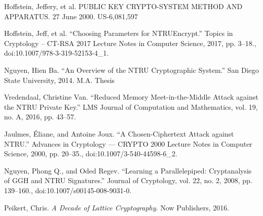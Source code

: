 \documentclass[12pt]{amsart}
\theoremstyle{definition}
\theoremstyle{remark}
\begin{document}
\begin{thebibliography}{1}

 Hoffstein, Jeffery, et al. PUBLIC KEY CRYPTO-SYSTEM METHOD AND APPARATUS. 27 June 2000. US-6,081,597

 Hoffstein, Jeff, et al. “Choosing Parameters for NTRUEncrypt.” Topics in Cryptology – CT-RSA 2017 Lecture Notes in Computer Science, 2017, pp. 3–18., doi:10.1007/978-3-319-52153-4\_1.

 Nguyen, Hien Ba. “An Overview of the NTRU Cryptographic System.” San Diego State University, 2014. M.A. Thesis

 Vredendaal, Christine Van. “Reduced Memory Meet-in-the-Middle Attack  against the NTRU Private Key.” LMS Journal of Computation and Mathematics, vol. 19, no. A, 2016, pp. 43–57.

 Jaulmes, Éliane, and Antoine Joux. “A Chosen-Ciphertext Attack against NTRU.” Advances in Cryptology — CRYPTO 2000 Lecture Notes in Computer Science, 2000, pp. 20–35., doi:10.1007/3-540-44598-6\_2.

 Nguyen, Phong Q., and Oded Regev. “Learning a Parallelepiped: Cryptanalysis of GGH and NTRU Signatures.” Journal of Cryptology, vol. 22, no. 2, 2008, pp. 139–160., doi:10.1007/s00145-008-9031-0.

 Peikert, Chris. \textit{A Decade of Lattice Cryptography}. Now Publishers, 2016.

\end{thebibliography}
\end{document}
